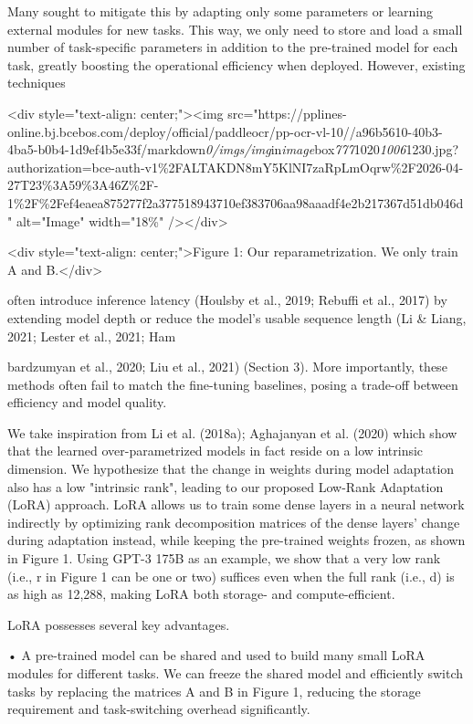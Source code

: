 \documentclass[conference]{IEEEtran}
\begin{document}
Many sought to mitigate this by adapting only some parameters or learning external modules for new tasks. This way, we only need to store and load a small number of task-specific parameters in addition to the pre-trained model for each task, greatly boosting the operational efficiency when deployed. However, existing techniques

\textless{}div style="text-align: center;"\textgreater{}\textless{}img src="https://pplines-online.bj.bcebos.com/deploy/official/paddleocr/pp-ocr-vl-10//a96b5610-40b3-4ba5-b0b4-1d9ef4b5e33f/markdown\textit{0/imgs/img}in\textit{image}box\textit{777}1020\textit{1006}1230.jpg?authorization=bce-auth-v1\%2FALTAKDN8mY5KlNI7zaRpLmOqrw\%2F2026-04-27T23\%3A59\%3A46Z\%2F-1\%2F\%2Fef4eaea875277f2a377518943710ef383706aa98aaadf4e2b217367d51db046d" alt="Image" width="18\%" /\textgreater{}\textless{}/div\textgreater{}

\textless{}div style="text-align: center;"\textgreater{}Figure 1: Our reparametrization. We only train A and B.\textless{}/div\textgreater{}

often introduce inference latency (Houlsby et al., 2019; Rebuffi et al., 2017) by extending model depth or reduce the model's usable sequence length (Li \& Liang, 2021; Lester et al., 2021; Ham

bardzumyan et al., 2020; Liu et al., 2021) (Section 3). More importantly, these methods often fail to match the fine-tuning baselines, posing a trade-off between efficiency and model quality.

We take inspiration from Li et al. (2018a); Aghajanyan et al. (2020) which show that the learned over-parametrized models in fact reside on a low intrinsic dimension. We hypothesize that the change in weights during model adaptation also has a low "intrinsic rank", leading to our proposed Low-Rank Adaptation (LoRA) approach. LoRA allows us to train some dense layers in a neural network indirectly by optimizing rank decomposition matrices of the dense layers' change during adaptation instead, while keeping the pre-trained weights frozen, as shown in Figure 1. Using GPT-3 175B as an example, we show that a very low rank (i.e., r in Figure 1 can be one or two) suffices even when the full rank (i.e., d) is as high as 12,288, making LoRA both storage- and compute-efficient.

LoRA possesses several key advantages.

• A pre-trained model can be shared and used to build many small LoRA modules for different tasks. We can freeze the shared model and efficiently switch tasks by replacing the matrices A and B in Figure 1, reducing the storage requirement and task-switching overhead significantly.
\end{document}
